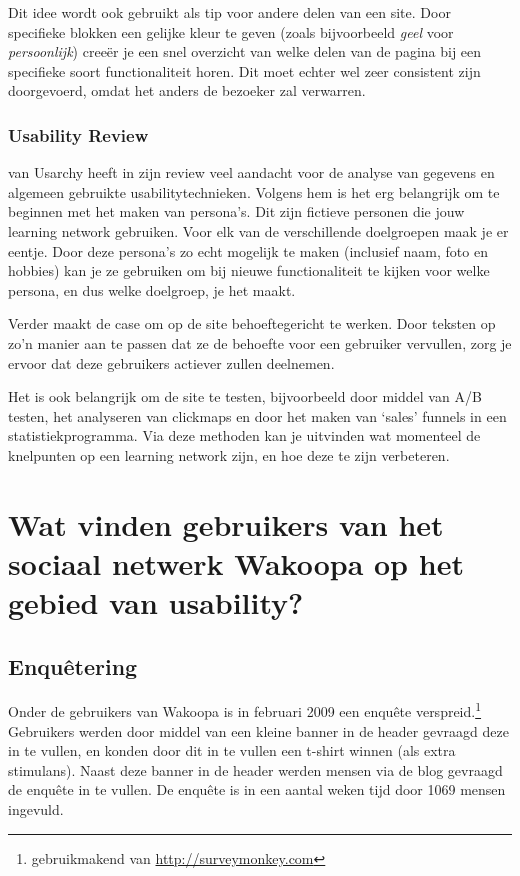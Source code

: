 \documentclass[a4paper, 10pt, pdftex]{report}
\begin{document}
    Dit idee wordt ook gebruikt als tip voor andere delen van een site. Door specifieke blokken een gelijke kleur te geven (zoals bijvoorbeeld \emph{geel} voor \emph{persoonlijk}) cree\"er je een snel overzicht van welke delen van de pagina bij een specifieke soort functionaliteit horen. Dit moet echter wel zeer consistent zijn doorgevoerd, omdat het anders de bezoeker zal verwarren.

    \subsection{Usability Review \citet{Timmerman2008}}
    \citeauthor{Timmerman2008} van Usarchy heeft in zijn review veel aandacht voor de analyse van gegevens en algemeen gebruikte usabilitytechnieken. Volgens hem is het erg belangrijk om te beginnen met het maken van persona's. Dit zijn fictieve personen die jouw learning network gebruiken. Voor elk van de verschillende doelgroepen maak je er eentje. Door deze persona's zo echt mogelijk te maken (inclusief naam, foto en hobbies) kan je ze gebruiken om bij nieuwe functionaliteit te kijken voor welke persona, en dus welke doelgroep, je het maakt.

    Verder maakt \citeauthor{Timmerman2008} de case om op de site behoeftegericht te werken. Door teksten op zo'n manier aan te passen dat ze de behoefte voor een gebruiker vervullen, zorg je ervoor dat deze gebruikers actiever zullen deelnemen.

    Het is ook belangrijk om de site te testen, bijvoorbeeld door middel van A/B testen, het analyseren van clickmaps en door het maken van `sales' funnels in een statistiekprogramma. Via deze methoden kan je uitvinden wat momenteel de knelpunten op een learning network zijn, en hoe deze te zijn verbeteren.


  \newpage
  \chapter{Wat vinden gebruikers van het sociaal netwerk Wakoopa op het gebied van usability?}
    \label{userchapter}
    \newpage
    \section{Enqu\^etering}
    Onder de gebruikers van Wakoopa is in februari 2009 een enqu\^ete verspreid.\footnote{gebruikmakend van \url{http://surveymonkey.com}} Gebruikers werden door middel van een kleine banner in de header gevraagd deze in te vullen, en konden door dit in te vullen een t-shirt winnen (als extra stimulans). Naast deze banner in de header werden mensen via de blog gevraagd de enqu\^ete in te vullen. De enqu\^ete is in een aantal weken tijd door 1069 mensen ingevuld.
\end{document}

